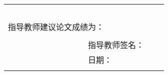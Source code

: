 \begin{table}[h]
\begin{tabular}{|p{0.2\linewidth}p{0.2\linewidth}p{0.2\linewidth}p{0.2\linewidth}|}
		\multicolumn{4}{|l|}{}                                                                                                 \\
		\multicolumn{4}{|l|}{}                                                                                                 \\
		\multicolumn{4}{|l|}{}                                                                                                 \\
		\multicolumn{4}{|l|}{}                                                                                                 \\
		\hline
		\multicolumn{4}{|l|}{}                                                                                                 \\
		\multicolumn{4}{|l|}{指导教师建议论文成绩为：}                                                                         \\
		\multicolumn{4}{|l|}{}                                                                                                 \\
		                               &                        & \multicolumn{2}{l|}{指导教师签名：}                          \\
		                               &                        & \multicolumn{2}{l|}{日期：}                                    \\
		\multicolumn{4}{|l|}{}                                                                                                 \\
		\hline
	\end{tabular}
\end{table}
